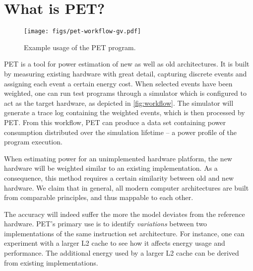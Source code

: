 \section{What is PET?}
\label{sec:whatispet}
\begin{figure}
    \texttt{[image: figs/pet-workflow-gv.pdf]}
    \caption{Example usage of the PET program.}
    \label{fig:workflow}
\end{figure}

PET is a tool for power estimation of new as well as old architectures. It is
built by measuring existing hardware with great detail, capturing discrete events
and assigning each event a certain energy cost. When selected events have been
weighted, one can run test programs through a simulator which is configured to
act as the target hardware, as depicted in \autoref{fig:workflow}. The simulator
will generate a trace log containing the weighted events, which is then
processed by PET. From this workflow, PET can produce a data set containing
power consumption distributed over the simulation lifetime -- a power profile of
the program execution.

When estimating power for an unimplemented hardware platform, the new hardware
will be weighted similar to an existing implementation. As a consequence, this
method requires a certain similarity between old and new hardware. We claim that
in general, all modern computer architectures are built from comparable
principles, and thus mappable to each other.

The accuracy will indeed suffer the more the model deviates from the reference
hardware. PET's primary use is to identify \emph{variations} between two
implementations of the same instruction set architecture. For instance, one can
experiment with a larger L2 cache to see how it affects energy usage and
performance. The additional energy used by a larger L2 cache can be derived from
existing implementations.

